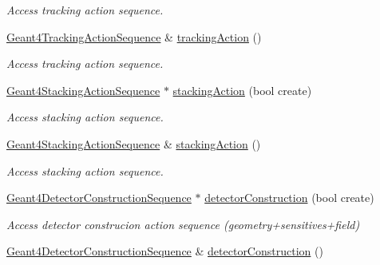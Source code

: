 \begin{DoxyCompactItemize}
\begin{DoxyCompactList}\small\item\em Access tracking action sequence. \end{DoxyCompactList}\item 
\hyperlink{class_d_d4hep_1_1_simulation_1_1_geant4_tracking_action_sequence}{Geant4\+Tracking\+Action\+Sequence} \& \hyperlink{class_d_d4hep_1_1_simulation_1_1_geant4_action_container_a39580aa5a9e07279b16b2739efba2608}{tracking\+Action} ()
\begin{DoxyCompactList}\small\item\em Access tracking action sequence. \end{DoxyCompactList}\item 
\hyperlink{class_d_d4hep_1_1_simulation_1_1_geant4_stacking_action_sequence}{Geant4\+Stacking\+Action\+Sequence} $\ast$ \hyperlink{class_d_d4hep_1_1_simulation_1_1_geant4_action_container_ad9a53bd3401686eeeb711ef467b2a800}{stacking\+Action} (bool create)
\begin{DoxyCompactList}\small\item\em Access stacking action sequence. \end{DoxyCompactList}\item 
\hyperlink{class_d_d4hep_1_1_simulation_1_1_geant4_stacking_action_sequence}{Geant4\+Stacking\+Action\+Sequence} \& \hyperlink{class_d_d4hep_1_1_simulation_1_1_geant4_action_container_a688c893718ea08ea0c7fe7432506915b}{stacking\+Action} ()
\begin{DoxyCompactList}\small\item\em Access stacking action sequence. \end{DoxyCompactList}\item 
\hyperlink{class_d_d4hep_1_1_simulation_1_1_geant4_detector_construction_sequence}{Geant4\+Detector\+Construction\+Sequence} $\ast$ \hyperlink{class_d_d4hep_1_1_simulation_1_1_geant4_action_container_a4dba304abe94e83eaef9c22aa196454b}{detector\+Construction} (bool create)
\begin{DoxyCompactList}\small\item\em Access detector construcion action sequence (geometry+sensitives+field) \end{DoxyCompactList}\item 
\hyperlink{class_d_d4hep_1_1_simulation_1_1_geant4_detector_construction_sequence}{Geant4\+Detector\+Construction\+Sequence} \& \hyperlink{class_d_d4hep_1_1_simulation_1_1_geant4_action_container_a21020ac85efccf58c0b292d25a954a15}{detector\+Construction} ()

\end{DoxyCompactItemize}
